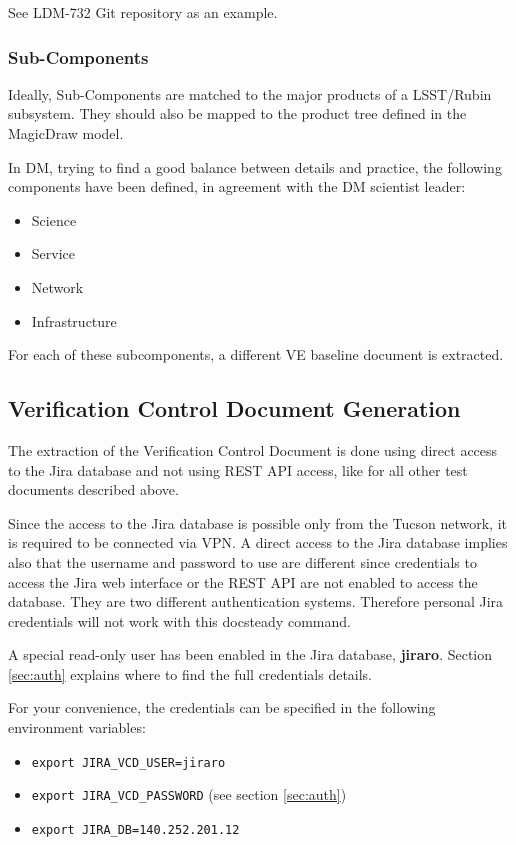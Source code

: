See LDM-732 Git repository as an example.


\subsubsection{Sub-Components}\label{sec:subcomp}

Ideally, Sub-Components are matched to the major products of a LSST/Rubin subsystem. 
They should also be mapped to the product tree defined in the MagicDraw model.

In DM, trying to find a good balance between details and practice, the following components have been defined, in agreement with the DM scientist leader:

\begin{itemize}
\item Science
\item Service
\item Network
\item Infrastructure
\end{itemize}

For each of these subcomponents, a different VE baseline document is extracted.



\subsection{Verification Control Document Generation}

The extraction of the Verification Control Document is done using direct access to the Jira database and not using REST API access, like for all other test documents described above.

Since the access to the Jira database is possible only from the Tucson network, it is required to be connected via VPN.
A direct access to the Jira database implies also that the username and password to use are different since credentials to access the Jira web interface or the REST API are not enabled to access the database. They are two different authentication systems.
Therefore personal Jira credentials will not work with this docsteady command.

A special read-only user has been enabled in the Jira database, \textbf{jiraro}.
Section \ref{sec:auth} explains where to find the full credentials details.

For your convenience, the credentials can be specified in the following environment variables:

\begin{itemize}
\item \texttt{export JIRA\_VCD\_USER=jiraro}
\item \texttt{export JIRA\_VCD\_PASSWORD} (see section \ref{sec:auth})
\item \texttt{export JIRA\_DB=140.252.201.12}
\end{itemize}

